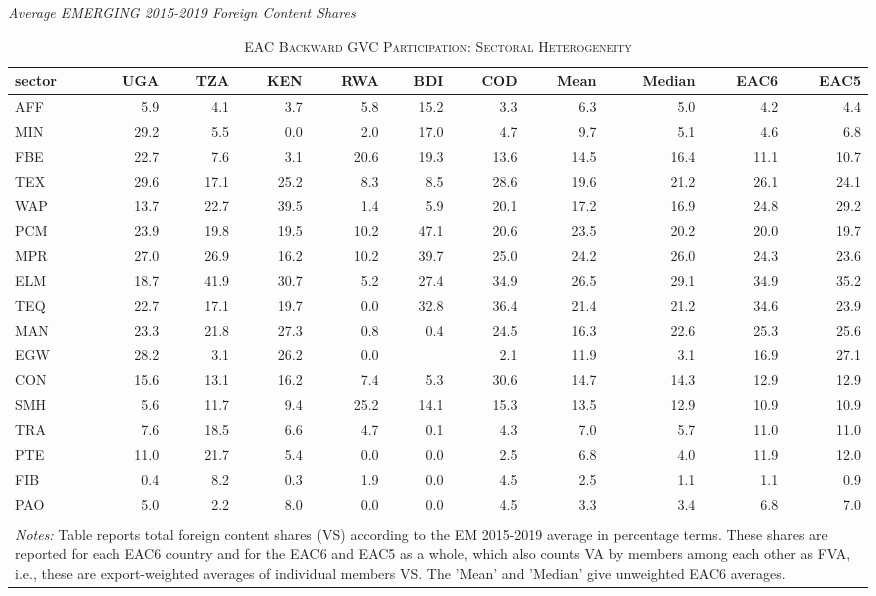 \documentclass[a4paper]{article}
\begin{document}
\begin{table}[ht] 
\centering
\caption{\label{tab:EACVB_sec}\textsc{EAC Backward GVC Participation: Sectoral Heterogeneity}}
\small{\textit{Average EMERGING 2015-2019 Foreign Content Shares}} \\
\vspace{1mm}
\begin{tabular}{lrrrrrrrrrr}
  \toprule
sector & UGA & TZA & KEN & RWA & BDI & COD & Mean & Median & EAC6 & EAC5 \\ 
  \midrule
AFF & 5.9 & 4.1 & 3.7 & 5.8 & 15.2 & 3.3 & 6.3 & 5.0 & 4.2 & 4.4\\ 
  MIN & 29.2 & 5.5 & 0.0 & 2.0 & 17.0 & 4.7 & 9.7 & 5.1 & 4.6 & 6.8\\ 
  FBE & 22.7 & 7.6 & 3.1 & 20.6 & 19.3 & 13.6 & 14.5 & 16.4 & 11.1 & 10.7\\ 
  TEX & 29.6 & 17.1 & 25.2 & 8.3 & 8.5 & 28.6 & 19.6 & 21.2 & 26.1 & 24.1\\ 
  WAP & 13.7 & 22.7 & 39.5 & 1.4 & 5.9 & 20.1 & 17.2 & 16.9 & 24.8 & 29.2\\ 
  PCM & 23.9 & 19.8 & 19.5 & 10.2 & 47.1 & 20.6 & 23.5 & 20.2 & 20.0 & 19.7\\ 
  MPR & 27.0 & 26.9 & 16.2 & 10.2 & 39.7 & 25.0 & 24.2 & 26.0 & 24.3 & 23.6\\ 
  ELM & 18.7 & 41.9 & 30.7 & 5.2 & 27.4 & 34.9 & 26.5 & 29.1 & 34.9 & 35.2\\ 
  TEQ & 22.7 & 17.1 & 19.7 & 0.0 & 32.8 & 36.4 & 21.4 & 21.2 & 34.6 & 23.9\\ 
  MAN & 23.3 & 21.8 & 27.3 & 0.8 & 0.4 & 24.5 & 16.3 & 22.6 & 25.3 & 25.6\\ 
  EGW & 28.2 & 3.1 & 26.2 & 0.0 &  & 2.1 & 11.9 & 3.1 & 16.9 & 27.1\\ 
  CON & 15.6 & 13.1 & 16.2 & 7.4 & 5.3 & 30.6 & 14.7 & 14.3 & 12.9 & 12.9\\ 
  SMH & 5.6 & 11.7 & 9.4 & 25.2 & 14.1 & 15.3 & 13.5 & 12.9 & 10.9 & 10.9\\ 
  TRA & 7.6 & 18.5 & 6.6 & 4.7 & 0.1 & 4.3 & 7.0 & 5.7 & 11.0 & 11.0\\ 
  PTE & 11.0 & 21.7 & 5.4 & 0.0 & 0.0 & 2.5 & 6.8 & 4.0 & 11.9 & 12.0\\ 
  FIB & 0.4 & 8.2 & 0.3 & 1.9 & 0.0 & 4.5 & 2.5 & 1.1 & 1.1 & 0.9\\ 
  PAO & 5.0 & 2.2 & 8.0 & 0.0 & 0.0 & 4.5 & 3.3 & 3.4 & 6.8 & 7.0\\ 
   \bottomrule  \\ [-0.9em]
\multicolumn{11}{l}{\parbox{0.85\textwidth}{\scriptsize
\textit{Notes:} Table reports total foreign content shares (VS) according to the EM 2015-2019 average in percentage terms. These shares are reported for each EAC6 country and for the EAC6 and EAC5 as a whole, which also counts VA by members among each other as FVA, i.e., these are export-weighted averages of individual members VS. The 'Mean' and 'Median' give unweighted EAC6 averages.}}
\end{tabular}
\end{table}
\FloatBarrier
\end{document}

